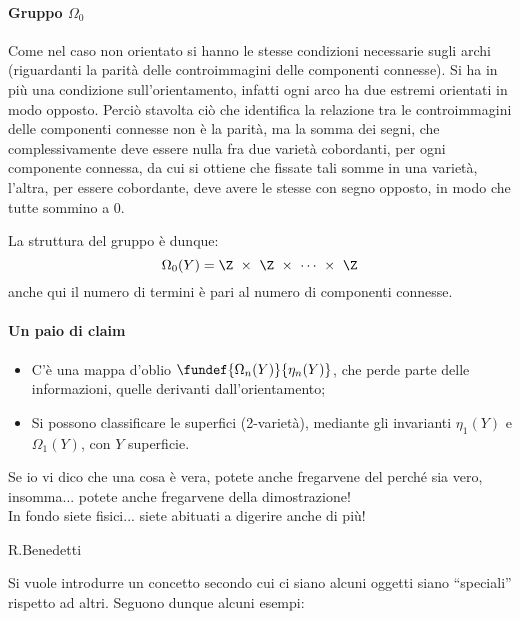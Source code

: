 \paragraph{Gruppo $\Omega_0$}
Come nel caso non orientato si hanno le stesse condizioni necessarie sugli archi (riguardanti la parità delle controimmagini delle componenti connesse). Si ha in più una condizione sull'orientamento, infatti ogni arco ha due estremi orientati in modo opposto.
Perciò stavolta ciò che identifica la relazione tra le controimmagini delle componenti connesse non è la parità, ma la somma dei segni, che complessivamente deve essere nulla fra due varietà cobordanti, per ogni componente connessa, da cui si ottiene che fissate tali somme in una varietà, l'altra, per essere cobordante, deve avere le stesse con segno opposto, in modo che tutte sommino a 0.

La struttura del gruppo è dunque: 
\begin{equation*}
\Omega_0(Y) = \Z~\times~\Z~\times~\cdots~\times~\Z
\end{equation*}
anche qui il numero di termini è pari al numero di componenti connesse.


\paragraph{Un paio di claim}
\begin{itemize}
\item C'è una mappa d'oblio $\fundef{\Omega_n(Y)}{\eta_n(Y)}$, che perde parte delle informazioni, quelle derivanti dall'orientamento;
\item Si possono classificare le superfici (2-varietà), mediante gli invarianti $\eta_1(Y)$ e $\Omega_1(Y)$, con $Y$ superficie.
\end{itemize}


\epigraph{Se io vi dico che una cosa è vera, potete anche fregarvene del perché sia vero, insomma... potete anche fregarvene della dimostrazione!\\ In fondo siete fisici... siete abituati a digerire anche di più!}{R.Benedetti}

Si vuole introdurre un concetto secondo cui ci siano alcuni oggetti siano ``speciali'' rispetto ad altri. Seguono dunque alcuni esempi:

